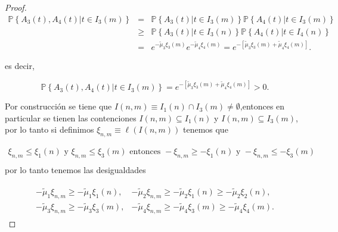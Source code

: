 \documentclass{article}
\newcommand{\prob}{\mathbb{P}}
\begin{document}
\begin{proof}
\begin{eqnarray*}
\prob\left\{A_{3}\left(t\right),A_{4}\left(t\right)|t\in I_{3}\left(m\right)\right\}&=&
\prob\left\{A_{3}\left(t\right)|t\in I_{3}\left(m\right)\right\}
\prob\left\{A_{4}\left(t\right)|t\in I_{3}\left(m\right)\right\}\\
&\geq&
\prob\left\{A_{3}\left(t\right)|t\in I_{3}\left(n\right)\right\}
\prob\left\{A_{4}\left(t\right)|t\in I_{4}\left(n\right)\right\}\\
&=&e^{-\tilde{\mu}_{3}\xi_{3}\left(m\right)}e^{-\tilde{\mu}_{4}\xi_{4}
\left(m\right)}
=e^{-\left[\tilde{\mu}_{3}\xi_{3}\left(m\right)+\tilde{\mu}_{4}\xi_{4}
\left(m\right)\right]}.
\end{eqnarray*}


es decir, 

\begin{equation}
\prob\left\{A_{3}\left(t\right),A_{4}\left(t\right)|t\in I_{3}\left(m\right)\right\}
=e^{-\left[\tilde{\mu}_{3}\xi_{3}\left(m\right)+\tilde{\mu}_{4}\xi_{4}
\left(m\right)\right]}>0.
\end{equation}

Por construcci\'on se tiene que $I\left(n,m\right)\equiv I_{1}\left(n\right)\cap I_{3}\left(m\right)\neq\emptyset$,entonces en particular se tienen las contenciones $I\left(n,m\right)\subseteq I_{1}\left(n\right)$ y $I\left(n,m\right)\subseteq I_{3}\left(m\right)$, por lo tanto si definimos $\xi_{n,m}\equiv\ell\left(I\left(n,m\right)\right)$ tenemos que

\begin{eqnarray*}
\xi_{n,m}\leq\xi_{1}\left(n\right)\textrm{ y }\xi_{n,m}\leq\xi_{3}\left(m\right)\textrm{ entonces }
-\xi_{n,m}\geq-\xi_{1}\left(n\right)\textrm{ y }-\xi_{n,m}\leq-\xi_{3}\left(m\right)\\
\end{eqnarray*}
por lo tanto tenemos las desigualdades 



\begin{eqnarray*}
\begin{array}{ll}
-\tilde{\mu}_{1}\xi_{n,m}\geq-\tilde{\mu}_{1}\xi_{1}\left(n\right),&
-\tilde{\mu}_{2}\xi_{n,m}\geq-\tilde{\mu}_{2}\xi_{1}\left(n\right)
\geq-\tilde{\mu}_{2}\xi_{2}\left(n\right),\\
-\tilde{\mu}_{3}\xi_{n,m}\geq-\tilde{\mu}_{3}\xi_{3}\left(m\right),&
-\tilde{\mu}_{4}\xi_{n,m}\geq-\tilde{\mu}_{4}\xi_{3}\left(m\right)
\geq-\tilde{\mu}_{4}\xi_{4}\left(m\right).
\end{array}
\end{eqnarray*}


\end{proof}
\end{document}
